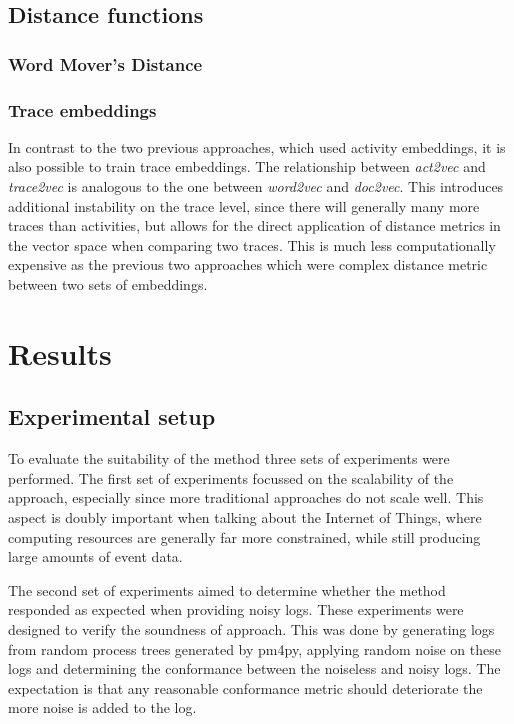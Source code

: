 \documentclass[runningheads]{template/llncs}
\begin{document}
\subsection{Distance functions}
\subsubsection{Word Mover's Distance}

\subsubsection{Trace embeddings}
In contrast to the two previous approaches, which used activity embeddings, it is also possible to train trace embeddings.
The relationship between \emph{act2vec} and \emph{trace2vec} is analogous to the one between \emph{word2vec} and \emph{doc2vec}.
This introduces additional instability on the trace level, since there will generally many more traces than activities, but allows for the direct application of distance metrics in the vector space when comparing two traces.
This is much less computationally expensive as the previous two approaches which were complex distance metric between two sets of embeddings.

\section{Results}

\subsection{Experimental setup}

To evaluate the suitability of the method three sets of experiments were performed. 
The first set of experiments focussed on the scalability of the approach, especially since more traditional approaches do not scale well. This aspect is doubly important when talking about the Internet of Things, where computing resources are generally far more constrained, while still producing large amounts of event data.

The second set of experiments aimed to determine whether the method responded as expected when providing noisy logs.
These experiments were designed to verify the soundness of approach.
This was done by generating logs from random process trees generated by pm4py, applying random noise on these logs and determining the conformance between the noiseless and noisy logs.
The expectation is that any reasonable conformance metric should deteriorate the more noise is added to the log.
\end{document}
